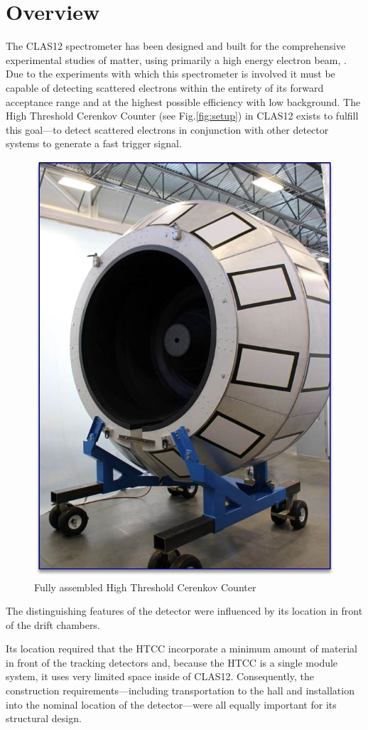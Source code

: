 \section{Overview}

The CLAS12 spectrometer has been designed and built for the comprehensive experimental studies of matter, using primarily a high energy electron beam, \cite{youris}. Due to the experiments with which this spectrometer is involved it must be capable of detecting scattered electrons within the entirety of its forward acceptance range and at the highest possible efficiency with low background. The High Threshold Cerenkov Counter (see Fig.\ref{fig:setup}) in CLAS12 exists to fulfill this goal---to detect scattered electrons in conjunction with other detector systems to generate a fast trigger signal. 

\begin{figure}[ht]
    \centering
    \includegraphics[width=0.75\linewidth]{images/Picture1.jpg}
    \caption{Fully assembled High Threshold Cerenkov Counter}
    \label{fig:Picture1}
\end{figure}
The distinguishing features of the detector were influenced by its location in front of the drift chambers. 

Its location required that the HTCC incorporate a minimum amount of material in front of the tracking detectors and, because the HTCC is a single module system, it uses very limited space inside of CLAS12. Consequently, the construction requirements---including transportation to the hall and installation into the nominal location of the detector---were all equally important for its structural design. 






